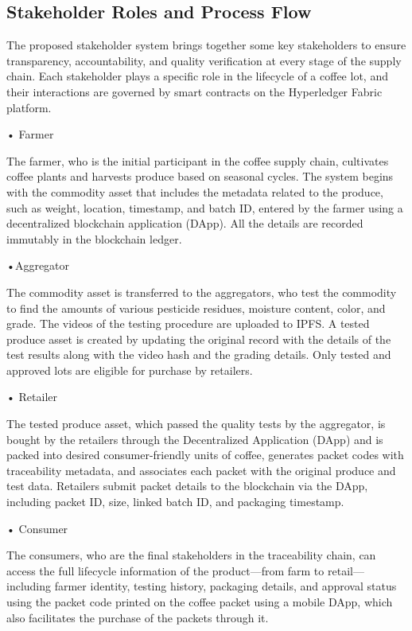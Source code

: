 \documentclass[12pt]{article}
\begin{document}
	
	
	
	
	
	
	
	\subsection{Stakeholder Roles and Process Flow}
	
	The proposed stakeholder system brings together some key stakeholders to ensure transparency, accountability, and quality verification at every stage of the supply chain. Each stakeholder plays a specific role in the lifecycle of a coffee lot, and their interactions are governed by smart contracts on the Hyperledger Fabric platform. 
	
	
	• Farmer
	
	The farmer, who is the initial participant in the coffee supply chain, cultivates coffee plants and harvests produce based on seasonal cycles. The system begins with the commodity asset that includes the metadata related to the produce, such as weight, location, timestamp, and batch ID, entered by the farmer using a decentralized blockchain application (DApp). All the details are recorded immutably in the blockchain ledger.
	
	•Aggregator
	
	The commodity asset is transferred to the aggregators, who test the commodity to find the amounts of various pesticide residues, moisture content, color, and grade. The videos of the testing procedure are uploaded to IPFS. A tested produce asset is created by updating the original record with the details of the test results along with the video hash and the grading details. Only tested and approved lots are eligible for purchase by retailers.
	
	• Retailer
	
	The tested produce asset, which passed the quality tests by the aggregator, is bought by the retailers through the Decentralized Application (DApp) and is packed into desired consumer-friendly units of coffee, generates packet codes with traceability metadata, and associates each packet with the original produce and test data. Retailers submit packet details to the blockchain via the DApp, including packet ID, size, linked batch ID, and packaging timestamp.
	
	• Consumer
	
	The consumers, who are the final stakeholders in the traceability chain, can access the full lifecycle information of the product—from farm to retail—including farmer identity, testing history, packaging details, and approval status using the packet code printed on the coffee packet using a mobile DApp, which also facilitates the purchase of the packets through it.
	
\end{document}

